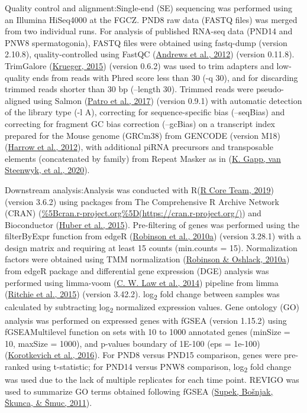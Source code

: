 \documentclass[12pt,twoside]{reedthesis}
\begin{document}
Quality control and alignment:Single-end (SE) sequencing was performed
using an Illumina HiSeq4000 at the FGCZ. PND8 raw data (FASTQ files) was
merged from two individual runs. For analysis of published RNA-seq data
(PND14 and PNW8 spermatogonia), FASTQ files were obtained using
fastq-dump (version 2.10.8), quality-controlled using FastQC
(\protect\hyperlink{ref-andrews2012}{Andrews et al., 2012}) (version 0.11.8). TrimGalore (\protect\hyperlink{ref-krueger2015}{Krueger, 2015}) (version
0.6.2) was used to trim adapters and low-quality ends from reads with
Phred score less than 30 (-q 30), and for discarding trimmed reads
shorter than 30 bp (--length 30). Trimmed reads were pseudo-aligned
using Salmon (\protect\hyperlink{ref-patro2017}{Patro et al., 2017}) (version 0.9.1) with automatic detection of
the library type (-l A), correcting for sequence-specific bias
(--seqBias) and correcting for fragment GC bias correction (--gcBias) on
a transcript index prepared for the Mouse genome (GRCm38) from GENCODE
(version M18) (\protect\hyperlink{ref-harrow2012}{Harrow et al., 2012}), with additional piRNA precursors and
transposable elements (concatenated by family) from Repeat Masker as in
(\protect\hyperlink{ref-gapp2020}{K. Gapp, van Steenwyk, et al., 2020}).

Downstream analysis:Analysis was conducted with R(\protect\hyperlink{ref-rcoreteam2019}{R Core Team, 2019})
(version 3.6.2) using packages from The Comprehensive R Archive Network
(CRAN)
(\url{\%5Bcran.r-project.org\%5D(https://cran.r-project.org/)})
and Bioconductor (\protect\hyperlink{ref-huber2015}{Huber et al., 2015}). Pre-filtering of genes was performed
using the filterByExpr function from edgeR (\protect\hyperlink{ref-robinson2010}{Robinson et al., 2010a}) (version
3.28.1) with a design matrix and requiring at least 15 counts
(min.counts = 15). Normalization factors were obtained using TMM
normalization (\protect\hyperlink{ref-robinson2010a}{Robinson \& Oshlack, 2010a}) from edgeR package and differential gene
expression (DGE) analysis was performed using limma-voom (\protect\hyperlink{ref-law2014}{C. W. Law et al., 2014})
pipeline from limma (\protect\hyperlink{ref-ritchie2015}{Ritchie et al., 2015}) (version 3.42.2). log\textsubscript{2} fold change
between samples was calculated by subtracting log\textsubscript{2} normalized expression
values. Gene ontology (GO) analysis was performed on expressed genes
with fGSEA (version 1.15.2) using fGSEAMultilevel function on sets with
10 to 1000 annotated genes (minSize = 10, maxSize = 1000), and p-values
boundary of 1E-100 (eps = 1e-100) (\protect\hyperlink{ref-korotkevich2016}{Korotkevich et al., 2016}). For PND8 versus
PND15 comparison, genes were pre-ranked using t-statistic; for PND14
versus PNW8 comparison, log\textsubscript{2} fold change was used due to the lack of
multiple replicates for each time point. REVIGO was used to summarize GO
terms obtained following fGSEA (\protect\hyperlink{ref-supek2011}{Supek, Bošnjak, Škunca, \& Šmuc, 2011}).
\end{document}
